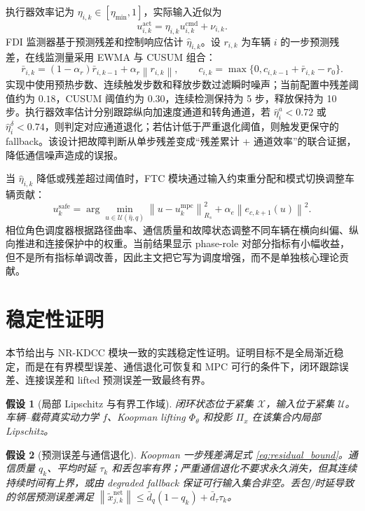 \documentclass[twocolumn,3p,times,procedia]{elsarticle}
\newcommand{\Method}{NR-KDCC}
\newcommand{\norm}[1]{\left\lVert #1 \right\rVert}
\newtheorem{assumption}{假设}
\begin{document}
执行器效率记为 $\eta_{i,k}\in[\eta_{\min},1]$，实际输入近似为
\begin{equation}
u_{i,k}^{\mathrm{act}}=\eta_{i,k}u_{i,k}^{\mathrm{cmd}}+\nu_{i,k}.
\label{eq:actuator_efficiency}
\end{equation}
FDI 监测器基于预测残差和控制响应估计 $\hat\eta_{i,k}$。设 $r_{i,k}$ 为车辆 $i$ 的一步预测残差，在线监测量采用 EWMA 与 CUSUM 组合：
\begin{equation}
\bar r_{i,k}=(1-\alpha_r)\bar r_{i,k-1}+\alpha_r\norm{r_{i,k}},\qquad
c_{i,k}=\max\{0,c_{i,k-1}+\bar r_{i,k}-r_0\}.
\label{eq:fdi_ewma_cusum}
\end{equation}
实现中使用预热步数、连续触发步数和释放步数过滤瞬时噪声；当前配置中残差阈值约为 $0.18$，CUSUM 阈值约为 $0.30$，连续检测保持为 5 步，释放保持为 10 步。执行器效率估计分别跟踪纵向加速度通道和转角通道，若 $\hat\eta^a_i<0.72$ 或 $\hat\eta^\delta_i<0.74$，则判定对应通道退化；若估计低于严重退化阈值，则触发更保守的 fallback。该设计把故障判断从单步残差变成“残差累计 + 通道效率”的联合证据，降低通信噪声造成的误报。

当 $\hat\eta_{i,k}$ 降低或残差超过阈值时，FTC 模块通过输入约束重分配和模式切换调整车辆贡献：
\begin{equation}
u_k^\mathrm{safe}=\arg\min_{u\in\mathcal U(\hat\eta,q)}
\norm{u-u_k^\mathrm{mpc}}_{R_s}^2+
\alpha_e\norm{e_{c,k+1}(u)}^2 .
\label{eq:ftc_projection}
\end{equation}
相位角色调度器根据路径曲率、通信质量和故障状态调整不同车辆在横向纠偏、纵向推进和连接保护中的权重。当前结果显示 phase-role 对部分指标有小幅收益，但不是所有指标单调改善，因此主文把它写为调度增强，而不是单独核心理论贡献。

\section{稳定性证明}

本节给出与 \Method{} 模块一致的实践稳定性证明。证明目标不是全局渐近稳定，而是在有界模型误差、通信退化可恢复和 MPC 可行的条件下，闭环跟踪误差、连接误差和 lifted 预测误差一致最终有界。

\begin{assumption}[局部 Lipschitz 与有界工作域]
闭环状态位于紧集 $\mathcal X$，输入位于紧集 $\mathcal U$。车辆--载荷真实动力学 $f$、Koopman lifting $\Phi_\theta$ 和投影 $\Pi_x$ 在该集合内局部 Lipschitz。
\end{assumption}

\begin{assumption}[预测误差与通信退化]
Koopman 一步残差满足式 \eqref{eq:residual_bound}。通信质量 $q_k$、平均时延 $\tau_k$ 和丢包率有界；严重通信退化不要求永久消失，但其连续持续时间有上界，或由 degraded fallback 保证可行输入集合非空。丢包/时延导致的邻居预测误差满足 $\norm{\tilde x_{j,k}^{\mathrm{net}}}\le \bar d_q(1-q_k)+\bar d_\tau \tau_k$。
\end{assumption}
\end{document}
